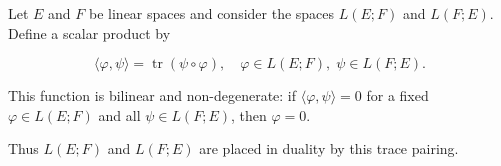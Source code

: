 Let $E$ and $F$ be linear spaces and consider the spaces $L(E;F)$ and $L(F;E)$. Define a scalar product by

$$\langle \varphi, \psi \rangle = \operatorname{tr} (\psi \circ \varphi), \quad \varphi \in L(E;F),\; \psi \in L(F;E).$$

This function is bilinear and non-degenerate: if $\langle \varphi, \psi \rangle = 0$ for a fixed $\varphi \in L(E;F)$ and all $\psi \in L(F;E)$, then $\varphi = 0$.

Thus $L(E;F)$ and $L(F;E)$ are placed in duality by this trace pairing.
